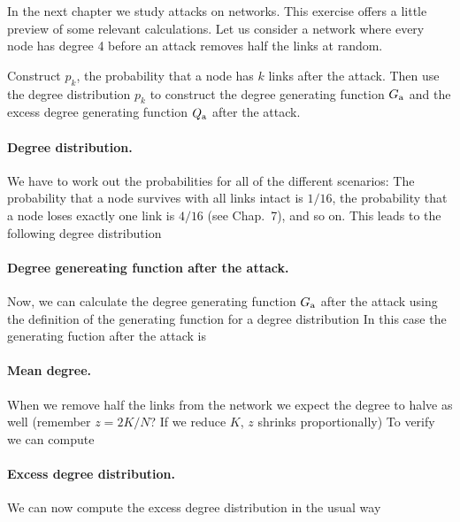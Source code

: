 In the next chapter we study attacks on networks. This exercise offers a little preview of some relevant calculations. Let us consider a network where every node has degree 4 before an attack removes half the links at random.  

\subquestion Construct $p_k$, the probability that a node has $k$ links after the attack. Then use the degree distribution $p_k$ to construct the degree generating function $G_{\rm a}$ and the excess degree generating function $Q_{\rm a}$ after the attack.

\solution
\paragraph{Degree distribution.}We have to work out the probabilities for all of the different scenarios: The probability that a node survives with all links intact is $1/16$, the probability that a node loses exactly one link is $4/16$ (see Chap.~7), and so on. This leads to the following degree distribution
\paragraph{Degree genereating function after the attack.}Now, we can calculate the degree generating function $G_{\rm a}$ after the attack using the definition of the generating function for a degree distribution
In this case the generating fuction after the attack is
\paragraph{Mean degree.}When we remove half the links from the network we expect the degree to halve as well (remember $z=2K/N$? If we reduce $K$, $z$ shrinks proportionally) 
To verify we can compute

\paragraph{Excess degree distribution.}We can now compute the excess degree distribution in the usual way 
